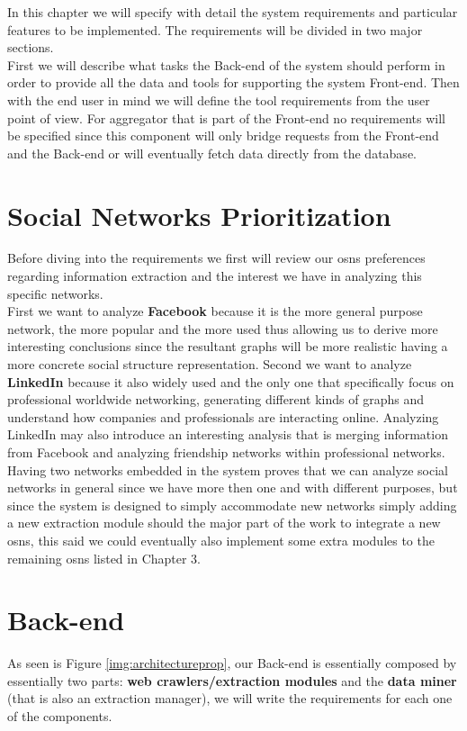 In this chapter we will specify with detail the system requirements and particular features to be implemented. The requirements
will be divided in two major sections.\\
\indent First we will describe what tasks the Back-end of the system should perform in order to provide
all the data and tools for supporting the system Front-end. Then with the end user in mind we will define the tool requirements from
the user point of view. For aggregator that is part of the Front-end no requirements will be specified since this component will only bridge
requests from the Front-end and the Back-end or will eventually fetch data directly from the database.

\section{Social Networks Prioritization}
Before diving into the requirements we first will review our \glspl{osn} preferences regarding information extraction and the
interest we have in analyzing this specific networks.\\
\indent First we want to analyze \textbf{Facebook} because it is the more general purpose network, the more popular and the more used
thus allowing us to derive more interesting conclusions since the resultant graphs will be more realistic having a more concrete social structure
representation. Second we want to analyze \textbf{LinkedIn} because it also widely used and the only one that specifically
focus on professional worldwide networking, generating different kinds of graphs and understand how companies and professionals
are interacting online. Analyzing LinkedIn may also introduce an interesting analysis that is merging information from Facebook and
analyzing friendship networks within professional networks.\\
\indent Having two networks embedded in the system proves that we can analyze social networks in general since we have more
then one and with different purposes, but since the system is designed to simply accommodate new networks simply adding
a new extraction module should the major part of the work to integrate a new \glspl{osn}, this said we could eventually
also implement some extra modules to the remaining \glspl{osn} listed in Chapter 3.

\section{Back-end}
As seen is Figure \ref{img:architectureprop}, our Back-end is essentially composed by essentially two parts: \textbf{web crawlers/extraction modules} and the \textbf{data miner} (that is also an extraction manager), we will write the requirements for each one of the components.

